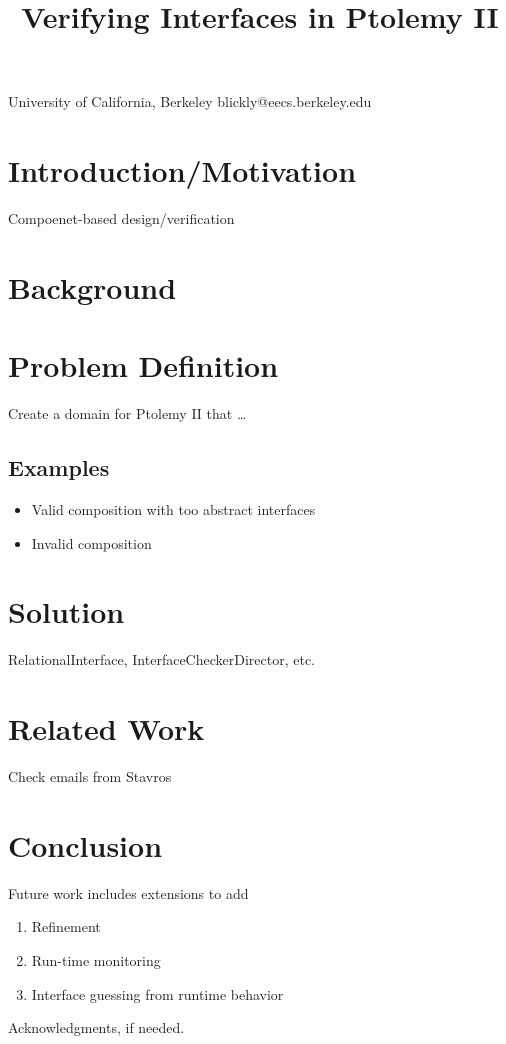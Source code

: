 \documentclass[preprint,11pt]{sigplanconf}
\begin{document}
\title{Verifying Interfaces in Ptolemy II}

           {University of California, Berkeley}
           {blickly@eecs.berkeley.edu}

\maketitle

\begin{abstract}
\end{abstract}

\section{Introduction/Motivation}
Compoenet-based design/verification
\section{Background}
\cite{realationalInterfaces}
\section{Problem Definition}
Create a domain for Ptolemy II that \dots
\subsection{Examples}
\begin{itemize}
	\item Valid composition with too abstract interfaces
	\item Invalid composition
\end{itemize}
\section{Solution}
RelationalInterface,
InterfaceCheckerDirector,
etc.
\section{Related Work}
Check emails from Stavros

\section{Conclusion}
Future work includes extensions to add
\begin{enumerate}
	\item Refinement
	\item Run-time monitoring
	\item Interface guessing from runtime behavior
\end{enumerate}

\acks

Acknowledgments, if needed.




\end{document}
